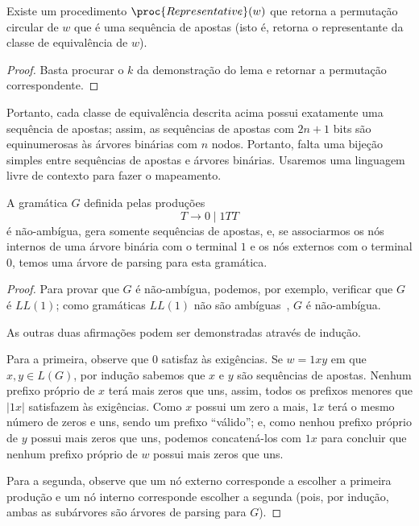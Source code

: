 \begin{corollary}
    Existe um procedimento $\proc{Representative}(w)$
    que retorna a permutação circular de $w$ que é uma sequência de apostas
    (isto é, retorna o representante da classe de equivalência de $w$).
\end{corollary}

\begin{proof}
    Basta procurar o $k$ da demonstração do lema
    e retornar a permutação correspondente.
\end{proof}

Portanto, cada classe de equivalência descrita acima
possui exatamente uma sequência de apostas;
assim, as sequências de apostas com $2n+1$ bits
são equinumerosas às árvores binárias com $n$ nodos.
Portanto,
falta uma bijeção simples entre sequências de apostas e árvores binárias.
Usaremos uma linguagem livre de contexto para fazer o mapeamento.

\begin{lemma}
    A gramática $G$ definida pelas produções
    \begin{equation*}
        T \to 0 \mid 1TT
    \end{equation*}
    é não-ambígua, gera somente sequências de apostas,
    e, se associarmos os nós internos de uma árvore binária com o terminal $1$
    e os nós externos com o terminal $0$,
    temos uma árvore de parsing para esta gramática.
\end{lemma}

\begin{proof}
    Para provar que $G$ é não-ambígua,
    podemos, por exemplo, verificar que $G$ é $LL(1)$; %
    como gramáticas $LL(1)$ não são ambíguas~\cite[p.~233]{AhoLamSethiUllman2006},
    $G$ é não-ambígua.

    As outras duas afirmações podem ser demonstradas através de indução.

    Para a primeira,
    observe que $0$ satisfaz às exigências.
    Se $w = 1xy$ em que $x, y \in L(G)$,
    por indução sabemos que $x$ e $y$ são sequências de apostas.
    Nenhum prefixo próprio de $x$ terá mais zeros que uns,
    assim, todos os prefixos menores que $|1x|$ satisfazem às exigências.
    Como $x$ possui um zero a mais, $1x$ terá o mesmo número de zeros e uns,
    sendo um prefixo ``válido'';
    e, como nenhou prefixo próprio de $y$ possui mais zeros que uns,
    podemos concatená-los com $1x$ para concluir que
    nenhum prefixo próprio de $w$ possui mais zeros que uns.

    Para a segunda,
    observe que um nó externo corresponde a escolher a primeira produção
    e um nó interno corresponde escolher a segunda
    (pois, por indução, ambas as subárvores são árvores de parsing para $G$).
\end{proof}

